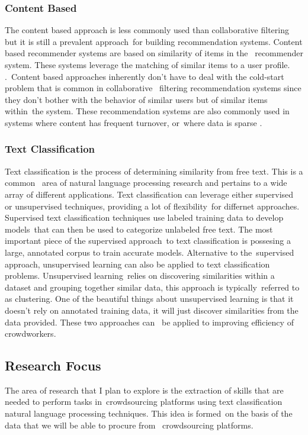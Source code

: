 \documentclass[letterpaper,12pt]{article}
\begin{document}
\subsubsection{Content Based}
The content based approach is less commonly used than collaborative filtering but it is still a prevalent approach\
for building recommendation systems. Content based recommender systems are based on similarity of items in the \
recommender system. These systems leverage the matching of similar items to a user profile. \cite{pazzani2007content}.\
Content based approaches inherently don't have to deal with the cold-start problem that is common in collaborative \
filtering recommendation systems since they don't bother with the behavior of similar users but of similar items within\
the system. These recommendation systems are also commonly used in systems where content has frequent turnover, or\
where data is sparse \cite{okura2017embedding}.

\subsubsection{Text Classification}
Text classification is the process of determining similarity from free text. This is a common \
area of natural language processing research and pertains to a wide array of different applications. 
Text classification can leverage either supervised or unsupervised techniques, providing a lot of flexibility\
for differnet approaches. Supervised text classification techniques use labeled training data to develop models\
that can then be used to categorize unlabeled free text. The most important piece of the supervised approach\
to text classification is possesing a large, annotated corpus to train accurate models. Alternative to the\
supervised approach, unsupervised learning can also be applied to text classification problems. Unsupervised learning\
relies on discovering similarities within a dataset and grouping together similar data, this approach is typically\
referred to as clustering. One of the beautiful things about unsupervised learning is that it doesn't rely on
annotated training data, it will just discover similarities from the data provided. These two approaches can \ 
be applied to improving efficiency of crowdworkers.

\subsection{Research Focus}
The area of research that I plan to explore is the extraction of skills that are needed to perform tasks in\
crowdsourcing platforms using text classification natural language processing techniques. This idea is formed\
on the basis of the data that we will be able to procure from \
crowdsourcing platforms. 
\end{document}
